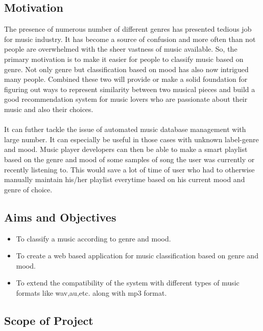 \subsection{Motivation}
The presence of numerous number of different genres has presented tedious job for music industry. It has become
a source of confusion and more often than not people are overwhelmed with the sheer vastness of music available.
So, the primary motivation is to make it easier for people to classify music based on genre. Not only
genre but classification based on mood has also now intrigued many people. Combined these two will provide 
or make a solid foundation for figuring out ways to represent similarity between two musical pieces and build a good recommendation
system for music lovers who are passionate about their music and also their choices.\\
\\
It can futher tackle the issue of automated music database management with large number.  It can especially be useful 
in those cases with unknown label-genre and mood. Music player developers can then be able to make a smart playlist based on the genre 
and mood of some samples of song the user was currently or recently listening to. This would save a lot of time of user who had to
otherwise manually maintain his/her playlist everytime based on his current mood and genre of choice.

\subsection{Aims and Objectives}
\begin{itemize}
        \item To classify a music according to genre and mood.
        \item To create a web based application for music classification based on genre and mood.
        \item To extend the compatibility of the system with different types of music formats like wav,au,etc. along with mp3 format.
\end{itemize}

\subsection{Scope of Project}


